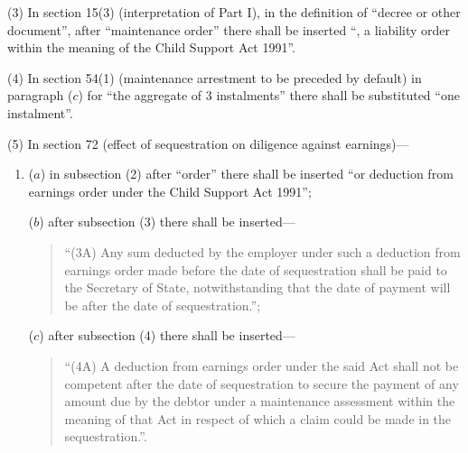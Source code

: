 \documentclass[12pt,a4paper]{article}
\begin{document}
(3) In section 15(3) (interpretation of Part I), in the definition of “decree or other document”, after “maintenance order” there shall be inserted “, a liability order within the meaning of the Child Support Act 1991”.

(4) In section 54(1) (maintenance arrestment to be preceded by default) in paragraph ($c$) for “the aggregate of 3 instalments” there shall be substituted “one instalment”.

(5) In section 72 (effect of sequestration on diligence against earnings)---
\begin{enumerate}\item[]
($a$) in subsection (2) after “order” there shall be inserted “or deduction from earnings order under the Child Support Act 1991”;

($b$) after subsection (3) there shall be inserted---
\begin{quotation}
“(3A) Any sum deducted by the employer under such a deduction from earnings order made before the date of sequestration shall be paid to the Secretary of State, notwithstanding that the date of payment will be after the date of sequestration.”;
\end{quotation}

($c$) after subsection (4) there shall be inserted—
\begin{quotation}
“(4A) A deduction from earnings order under the said Act shall not be competent after the date of sequestration to secure the payment of any amount due by the debtor under a maintenance assessment within the meaning of that Act in respect of which a claim could be made in the sequestration.”.
\end{quotation}
\end{enumerate}
\end{document}
